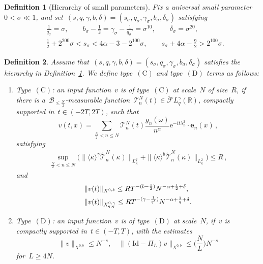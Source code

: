 \documentclass[10pt,a4paper]{amsart}
\newtheorem{definition}{Definition}
\newcommand{\R}{\mathbb{R}}
\newcommand{\e}{\mathrm{e}}
\newcommand{\la}{\langle}
\newcommand{\ra}{\rangle}
\begin{document}
\begin{definition}[Hierarchy of small parameters]\label{hierarchy}
	Fix a universal small parameter~$0<\sigma\ll 1$, and set~$(s,q,\gamma,b,\delta)=(s_{\sigma},q_{\sigma},\gamma_{\sigma},b_{\sigma},\delta_{\sigma})$ satisfying
	\begin{align*}
		&\frac{1}{q_{\sigma}}=\sigma, \qquad
		b_{\sigma}-\frac{1}{2}=\gamma_{\sigma}-\frac{1}{q_{\sigma}'}=\sigma^{10},\qquad
		\delta_{\sigma}=\sigma^{20},\\
		&\frac{1}{2}+2^{200}\sigma<s_{\sigma}<4\alpha-3-2^{100}\sigma,\qquad
		s_{\sigma}+4\alpha-\frac{9}{2}>2^{100}\sigma.
	\end{align*}
\end{definition}

\begin{definition}\label{def:CD}
	Assume that~$(s,q,\gamma,b,\delta)=(s_{\sigma},q_{\sigma},\gamma_{\sigma},b_{\sigma},\delta_{\sigma})$ satisfies the hierarchy in Definition~\ref{hierarchy}.
	We define type~$\mathrm{(C)}$ and type~$\mathrm{(D)}$ terms as follows:
	\begin{enumerate}
		\item Type~$\mathrm{(C)}$: an input function~$v$ is of type~$\mathrm{(C)}$ at scale~$N$ of size~$R$, if there is a~$\mathcal{B}_{\leq \frac{N}{2}}$-measurable function~$\mathcal{T}_n^N(t)\in\widetilde{\mathcal{F}}L_q^{\gamma}(\R)$, compactly supported in~$t\in(-2T,2T)$, such that
		\[
		v(t,x) = \sum_{\frac{N}{2}<n\leq N}
		\mathcal{T}^N_{n}(t)\frac{g_{n}(\omega)}{n^{\alpha}}\e^{-it\lambda_{n}^{2}}\cdot\mathbf{e}_{n}(x)\,,
		\]
		satisfying
		\begin{align}\label{bddef:TypeC}
		\sup_{\frac{N}{2}<n\leq N}\big(\|\langle\kappa\rangle^{\gamma}\widetilde{\mathcal{T}}^N_{n}(\kappa)\|_{L_{\kappa}^{q}} + \|\la\kappa\ra^b\widetilde{\mathcal{T}}^N_n(\kappa) \|_{L_{\kappa}^2}\big)
		\leq R  \,,
		\end{align}
		and
		\begin{align}\label{bddef:TypeC'}
		&\|v(t)\|_{X^{0,b}}\leq RT^{-(b-\frac{1}{2})}N^{-\alpha+\frac{1}{2}+\delta}, \notag \\ &\|v(t)\|_{X_{q,q}^{0,\gamma}}\leq RT^{-(\gamma-\frac{1}{q'})}N^{-\alpha+\frac{1}{q}+\delta}.
		\end{align}
		\item Type~$\mathrm{(D)}$: an input function~$v$ is of type~$\mathrm{(D)}$ at scale~$N$, if~$v$ is compactly supported in~$t\in(-T,T)$, with the estimates
		\[
		\|v\|_{X^{0,b}}
		\leq N^{-s},\quad \|(\mathrm{Id}-\Pi_L)v\|_{X^{0,b}}\leq  \big(\frac{N}{L}\big)N^{-s}
		\]
		for~$L\geq 4N$.
	\end{enumerate}
\end{definition}
\end{document}
